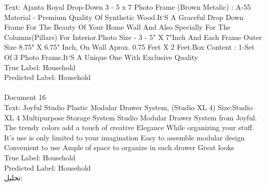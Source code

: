 \documentclass[a4paper,12pt]{article}
\begin{document}
{Text: Ajanta Royal Drop-Down 3 - 5 x 7 Photo Frame (Brown Metalic) : A-55 Material - Premium Quality Of Synthetic Wood.It`S A Graceful Drop Down Frame For The Beauty Of Your Home Wall And Also Specially For The Columns(Pillars) For Interior.Photo Size - 3 - 5" X 7"Inch And Each Frame Outer Size 8.75" X 6.75" Inch, On Wall Aprox. 0.75 Feet X 2 Feet.Box Content : 1-Set Of 3 Photo Frame.It`S A Unique One With Exclusive Quality\\
True Label: Household\\
Predicted Label: Household
\\
\\ Document 16\\
Text: Joyful Studio Plastic Modular Drawer System, (Studio XL 4) Size:Studio XL 4   Multipurpose Storage System Studio Modular Drawer System from Joyful. The trendy colors add a touch of creative Elegance While organizing your stuff. It's use is only limited to your imagination  Easy to assemble modular design Convenient to use Ample of space to organize in each drawer Great looks\\
True Label: Household\\
Predicted Label: Household\\
}
تحلیل:
\end{document}

